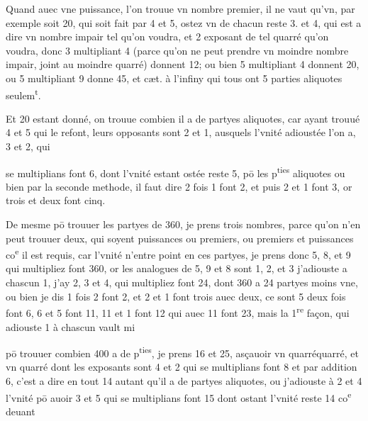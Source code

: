\documentclass[11pt,a4paper]{article}
\begin{document}
Quand auec vne puissance, l'on trouue vn nombre premier, il ne vaut qu'vn, par exemple soit 20, qui soit fait par 4 et 5, ostez vn de chacun reste 3. et 4, qui est a dire vn nombre impair tel qu'on voudra, et 2 exposant de tel quarré qu'on voudra, donc 3 multipliant 4 (parce qu'on ne peut prendre vn moindre nombre impair, joint au moindre quarré) donnent 12; ou bien 5 multipliant 4 donnent 20, ou 5 multipliant 9 donne 45, et cæt. à l'infiny qui tous ont 5 parties aliquotes seulem\textsuperscript{t}.

Et 20 estant donné, on trouue combien il a de partyes aliquotes, car ayant trouué 4 et 5 qui le refont, leurs opposants sont 2 et 1, ausquels l'vnité adioustée l'on a, 3 et 2, qui


se multiplians font 6, dont l'vnité estant ostée reste 5, pō les p\textsuperscript{ties} aliquotes ou bien par la seconde methode, il faut dire 2 fois 1 font 2, et puis 2 et 1 font 3, or trois et deux font cinq.

De mesme pō trouuer les partyes de 360, je prens trois nombres, parce qu'on n'en peut trouuer deux, qui soyent puissances ou premiers, ou premiers et puissances co\textsuperscript{e} il est requis, car l'vnité n'entre point en ces partyes, je prens donc 5, 8, et 9 qui multipliez font 360, or les analogues de 5, 9 et 8 sont 1, 2, et 3 j'adiouste a chascun 1, j'ay 2, 3 et 4, qui multipliez font 24, dont 360 a 24 partyes moins vne, ou bien je dis  1 fois 2 font 2, et 2 et 1 font trois auec deux, ce sont 5 deux fois font 6, 6 et 5 font 11, 11 et 1 font 12 qui auec 11 font 23, mais la 1\textsuperscript{re} façon, qui adiouste 1 à chascun vault mi

pō trouuer combien 400 a de p\textsuperscript{ties}, je prens 16 et 25, asçauoir vn quarréquarré, et vn quarré dont les exposants sont 4 et 2 qui se multiplians font 8 et par addition 6, c'est a dire en tout 14 autant qu'il a de partyes aliquotes, ou j'adiouste à 2 et 4 l'vnité pō auoir 3 et 5 qui se multiplians font 15 dont ostant l'vnité reste 14 co\textsuperscript{e} deuant
\end{document}
